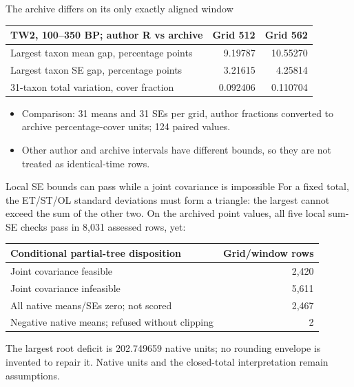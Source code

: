 \begin{frame}{The archive differs on its only exactly aligned window}
\small
\begin{tabular}{lrr}
\toprule
TW2, 100--350 BP; author R vs archive & Grid 512 & Grid 562 \\
\midrule
Largest taxon mean gap, percentage points & 9.19787 & 10.55270 \\
Largest taxon SE gap, percentage points & 3.21615 & 4.25814 \\
31-taxon total variation, cover fraction & 0.092406 & 0.110704 \\
\bottomrule
\end{tabular}
\begin{itemize}
\item Comparison: 31 means and 31 SEs per grid, author fractions converted to archive percentage-cover units; 124 paired values.
\item Other author and archive intervals have different bounds, so they are not treated as identical-time rows.
\end{itemize}
\end{frame}

\begin{frame}{Local SE bounds can pass while a joint covariance is impossible}
\small
For a fixed total, the ET/ST/OL standard deviations must form a triangle:
the largest cannot exceed the sum of the other two. On the archived point
values, all five local sum-SE checks pass in 8,031 assessed rows, yet:
\begin{center}
\begin{tabular}{lr}
\toprule
Conditional partial-tree disposition & Grid/window rows \\
\midrule
Joint covariance feasible & 2,420 \\
Joint covariance infeasible & 5,611 \\
All native means/SEs zero; not scored & 2,467 \\
Negative native means; refused without clipping & 2 \\
\bottomrule
\end{tabular}
\end{center}
The largest root deficit is 202.749659 native units; no rounding envelope is
invented to repair it. Native units and the closed-total interpretation remain assumptions.
\end{frame}


